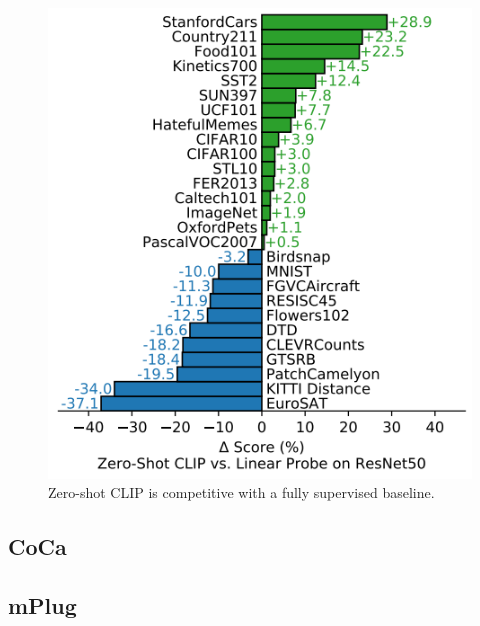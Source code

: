 \begin{figure}[h]
    \caption{Zero-shot CLIP is competitive with a fully supervised baseline.}
    \label{fig:clip-performance}
    \centering
    \includegraphics[width=1\textwidth]{Images/CLIPPerformance.png}
    \small
\end{figure}

\subsection{CoCa}


\subsection{mPlug}

